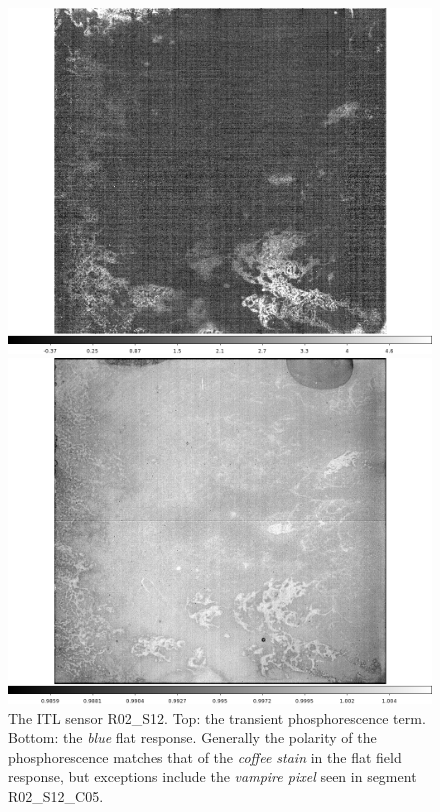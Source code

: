 \begin{figure}[!htbp]
\centering
\begin{minipage}{1.0\textwidth}    
  \centering
  \includegraphics[width=.6\linewidth]{figures/phosphorescence-survey/stains_phos_R02_S12.png}    
\end{minipage}
\begin{minipage}{1.0\textwidth}
  \centering
  \includegraphics[width=.6\linewidth]{figures/phosphorescence-survey/stains_abs_R02_S12.png}
\end{minipage}
\caption{The ITL sensor R02\_S12. Top: the transient phosphorescence term. Bottom: the {\it blue} flat response. Generally the polarity of the phosphorescence matches that of the {\it coffee stain} in the flat field response, but exceptions include the {\it vampire pixel} seen in segment R02\_S12\_C05.}
\label{fig:phos:stains:R02S12}
\end{figure}


